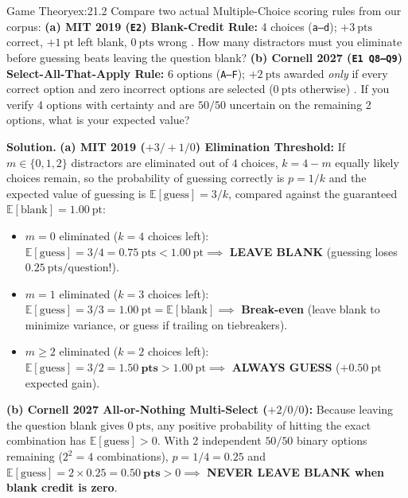 \begin{workedexample}{Game Theory}{ex:21.2}
Compare two actual Multiple-Choice scoring rules from our corpus:
\textbf{(a) MIT 2019 (\texttt{E2}) Blank-Credit Rule:} 4 choices (\texttt{a--d}); $+\SI{3}{\text{pts}}$ correct, $+\SI{1}{\text{pt}}$ left blank, $\SI{0}{\text{pts}}$ wrong . How many distractors must you eliminate before guessing beats leaving the question blank?
\textbf{(b) Cornell 2027 (\texttt{E1 Q8--Q9}) Select-All-That-Apply Rule:} 6 options (\texttt{A--F}); $+\SI{2}{\text{pts}}$ awarded \textit{only} if every correct option and zero incorrect options are selected ($\SI{0}{\text{pts}}$ otherwise) . If you verify 4 options with certainty and are $50/50$ uncertain on the remaining 2 options, what is your expected value?

\textbf{Solution.}
\textbf{(a) MIT 2019 ($+3 / +1 / 0$) Elimination Threshold:}
If $m \in \{0, 1, 2\}$ distractors are eliminated out of $4$ choices, $k = 4 - m$ equally likely choices remain, so the probability of guessing correctly is $p = 1/k$ and the expected value of guessing is $\mathbb{E}[\text{guess}] = 3/k$, compared against the guaranteed $\mathbb{E}[\text{blank}] = \SI{1.00}{\text{pt}}$:
\begin{itemize}
  \item $m = 0$ eliminated ($k = 4$ choices left): $\mathbb{E}[\text{guess}] = 3/4 = \SI{0.75}{\text{pts}} < \SI{1.00}{\text{pt}} \implies$ \textbf{LEAVE BLANK} (guessing loses $\SI{0.25}{\text{pts/question}}$!).
  \item $m = 1$ eliminated ($k = 3$ choices left): $\mathbb{E}[\text{guess}] = 3/3 = \SI{1.00}{\text{pt}} = \mathbb{E}[\text{blank}] \implies$ \textbf{Break-even} (leave blank to minimize variance, or guess if trailing on tiebreakers).
  \item $m \ge 2$ eliminated ($k = 2$ choices left): $\mathbb{E}[\text{guess}] = 3/2 = \mathbf{\SI{1.50}{\text{pts}}} > \SI{1.00}{\text{pt}} \implies$ \textbf{ALWAYS GUESS} ($+\SI{0.50}{\text{pt}}$ expected gain).
\end{itemize}
\textbf{(b) Cornell 2027 All-or-Nothing Multi-Select ($+2 / 0 / 0$):}
Because leaving the question blank gives $\SI{0}{\text{pts}}$, any positive probability of hitting the exact combination has $\mathbb{E}[\text{guess}] > 0$. With 2 independent $50/50$ binary options remaining ($2^2 = 4$ combinations), $p = 1/4 = 0.25$ and $\mathbb{E}[\text{guess}] = 2 \times 0.25 = \mathbf{\SI{0.50}{\text{pts}}} > 0 \implies$ \textbf{NEVER LEAVE BLANK when blank credit is zero}.
\end{workedexample}


